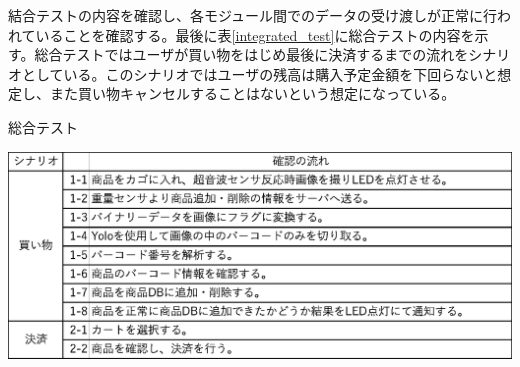 \newpage

結合テストの内容を確認し、各モジュール間でのデータの受け渡しが正常に行われていることを確認する。最後に表\ref{integrated_test}に総合テストの内容を示す。総合テストではユーザが買い物をはじめ最後に決済するまでの流れをシナリオとしている。このシナリオではユーザの残高は購入予定金額を下回らないと想定し、また買い物キャンセルすることはないという想定になっている。

\begin{table}[htbp]
\centering
\caption{総合テスト}
\includegraphics[width=15cm]{./pic/integrated_test.eps}
\label{integrated_test}
\end{table}

　
